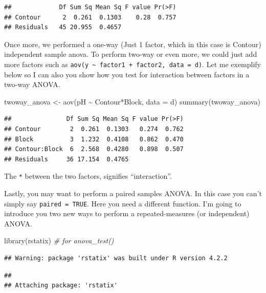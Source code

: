 \documentclass[
]{book}
\newenvironment{Shaded}{\begin{snugshade}}{\end{snugshade}}
\newcommand{\AttributeTok}[1]{\textcolor[rgb]{0.77,0.63,0.00}{#1}}
\newcommand{\CommentTok}[1]{\textcolor[rgb]{0.56,0.35,0.01}{\textit{#1}}}
\newcommand{\FunctionTok}[1]{\textcolor[rgb]{0.00,0.00,0.00}{#1}}
\newcommand{\NormalTok}[1]{#1}
\newcommand{\OtherTok}[1]{\textcolor[rgb]{0.56,0.35,0.01}{#1}}
\newcommand{\SpecialCharTok}[1]{\textcolor[rgb]{0.00,0.00,0.00}{#1}}
\begin{document}
\begin{verbatim}
##             Df Sum Sq Mean Sq F value Pr(>F)
## Contour      2  0.261  0.1303    0.28  0.757
## Residuals   45 20.955  0.4657
\end{verbatim}

Once more, we performed a one-way (Just 1 factor, which in this case is Contour) independent sample anova. To perform two-way or even more, we could just add more factors such as \texttt{aov(y\ \textasciitilde{}\ factor1\ +\ factor2,\ data\ =\ d)}. Let me exemplify below so I can also you show how you test for interaction between factors in a two-way ANOVA.

\begin{Shaded}
\begin{Highlighting}[]
\NormalTok{twoway\_anova }\OtherTok{\textless{}{-}} \FunctionTok{aov}\NormalTok{(pH }\SpecialCharTok{\textasciitilde{}}\NormalTok{ Contour}\SpecialCharTok{*}\NormalTok{Block, }\AttributeTok{data =}\NormalTok{ d)}
\FunctionTok{summary}\NormalTok{(twoway\_anova)}
\end{Highlighting}
\end{Shaded}

\begin{verbatim}
##               Df Sum Sq Mean Sq F value Pr(>F)
## Contour        2  0.261  0.1303   0.274  0.762
## Block          3  1.232  0.4108   0.862  0.470
## Contour:Block  6  2.568  0.4280   0.898  0.507
## Residuals     36 17.154  0.4765
\end{verbatim}

The \texttt{*} between the two factors, signifies ``interaction''.

Lastly, you may want to perform a paired samples ANOVA. In this case you can't simply say \texttt{paired\ =\ TRUE}. Here you need a different function. I'm going to introduce you two new ways to perform a repeated-measures (or independent) ANOVA.

\begin{Shaded}
\begin{Highlighting}[]
\FunctionTok{library}\NormalTok{(rstatix)  }\CommentTok{\# for anova\_test()}
\end{Highlighting}
\end{Shaded}

\begin{verbatim}
## Warning: package 'rstatix' was built under R version 4.2.2
\end{verbatim}

\begin{verbatim}
## 
## Attaching package: 'rstatix'
\end{verbatim}
\end{document}
